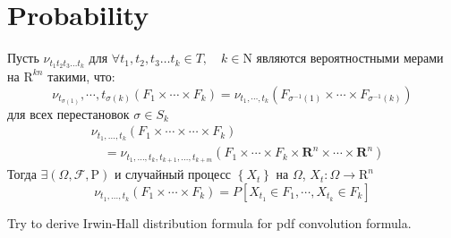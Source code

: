 \chapter{Probability}
\begin{thm}[Kolmogorov]
	Пусть $\nu_{t_1 t_2 t_3 \dots t_k}$ для  $\forall t_1, t_2, t_3 \dots t_k \in T, \quad  k \in \mathrm{N}$ являются вероятностными мерами на $\mathrm{R}^{kn}$ такими, что:
	\begin{equation}
		\nu_{t_{\sigma(1)}}, \cdots, t_{\sigma(k)}\left(F_{1} \times \cdots \times F_{k}\right)=\nu_{t_{1}, \cdots, t_{k}}\left(F_{\sigma^{-1}(1)} \times \cdots \times F_{\sigma^{-1}(k)}\right)
	\end{equation}
для всех перестановок $\sigma \in S_k $
\begin{equation}
	\begin{aligned}
		&\nu_{t_{1}, \ldots, t_{k}}\left(F_{1} \times \cdots \times \cdots \times F_{k}\right) \\
		&\quad=\nu_{t_{1}, \ldots, t_{k}, t_{k+1}, \ldots, t_{k+m}}\left(F_{1} \times \cdots \times F_{k} \times \mathbf{R}^{n} \times \cdots \times \mathbf{R}^{n}\right)
	\end{aligned}
\end{equation}
Тогда $\exists (\Omega, \mathcal{F}, \mathrm{P})$ и случайный процесс $\left\{X_t\right\}$ на $\Omega$, $X_t:\Omega \rightarrow   \mathrm{R}^n$
\begin{equation}
	\nu_{t_{1}, \ldots, t_{k}}\left(F_{1} \times \cdots \times F_{k}\right)=P\left[X_{t_{1}} \in F_{1}, \cdots, X_{t_{k}} \in F_{k}\right]
\end{equation}
\end{thm}	

\begin{exc}
	Try to derive Irwin-Hall distribution formula for pdf convolution formula.
\end{exc}